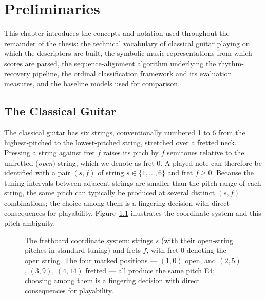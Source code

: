 \chapter{Preliminaries}
\label{ch:preliminaries}

This chapter introduces the concepts and notation used throughout the remainder of the thesis: the technical vocabulary of classical guitar playing on which the descriptors are built, the symbolic music representations from which scores are parsed, the sequence-alignment algorithm underlying the rhythm-recovery pipeline, the ordinal classification framework and its evaluation measures, and the baseline models used for comparison.

\section{The Classical Guitar}
\label{sec:prelim_guitar}
The classical guitar has six strings, conventionally numbered 1 to 6 from the highest-pitched to the lowest-pitched string, stretched over a fretted neck. Pressing a string against fret $f$ raises its pitch by $f$ semitones relative to the unfretted (\emph{open}) string, which we denote as fret 0. A played note can therefore be identified with a pair $(s, f)$ of string $s \in \{1, \dots, 6\}$ and fret $f \geq 0$. Because the tuning intervals between adjacent strings are smaller than the pitch range of each string, the same pitch can typically be produced at several distinct $(s, f)$ combinations; the choice among them is a fingering decision with direct consequences for playability. Figure~\ref{fig:fretboard} illustrates the coordinate system and this pitch ambiguity.

\begin{figure}[htbp]
    \centering
    \caption{The fretboard coordinate system: strings $s$ (with their open-string pitches in standard tuning) and frets $f$, with fret 0 denoting the open string. The four marked positions --- $(1, 0)$ open, and $(2, 5)$, $(3, 9)$, $(4, 14)$ fretted --- all produce the same pitch E4; choosing among them is a fingering decision with direct consequences for playability.}
    \label{fig:fretboard}
\end{figure}

